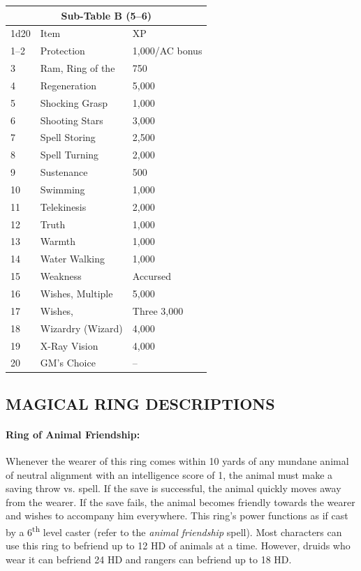 \begin{multicols}{2}
\begin{minipage}{\columnwidth}
\end{minipage}

\noindent
\begin{tabular}{|p{}|p{}|p{}|}
\multicolumn{3}{c}{Sub-Table B (5--6)} \\
\hline
1d20	& Item	& XP \\
\hline\hline
\rowcolor[gray]{.9}1--2	& Protection	& 1,000/AC bonus \\
3	& Ram, Ring of the	& 750 \\
\rowcolor[gray]{.9}4	& Regeneration	& 5,000 \\
5	& Shocking Grasp	& 1,000 \\
\rowcolor[gray]{.9}6	& Shooting Stars	& 3,000 \\
7	& Spell Storing	& 2,500 \\
\rowcolor[gray]{.9}8	& Spell Turning	& 2,000 \\
9	& Sustenance	& 500 \\
\rowcolor[gray]{.9}10	& Swimming	& 1,000 \\
11	& Telekinesis	& 2,000 \\
\rowcolor[gray]{.9}12	& Truth	& 1,000 \\
13	& Warmth	& 1,000 \\
\rowcolor[gray]{.9}14	& Water Walking	& 1,000 \\
15	& Weakness	& Accursed \\
\rowcolor[gray]{.9}16	& Wishes, Multiple	& 5,000 \\
17	& Wishes, & Three	3,000 \\
\rowcolor[gray]{.9}18	& Wizardry (Wizard)	& 4,000 \\
19	& X-Ray Vision	& 4,000 \\
\rowcolor[gray]{.9}20	& GM's Choice	& -- \\
\hline
\end{tabular}

\subsection{MAGICAL RING DESCRIPTIONS}

\paragraph{Ring of Animal Friendship:} Whenever the wearer of this ring comes within 10 yards of any mundane animal of neutral alignment with an intelligence score of 1, the animal must make a saving throw vs. spell.  If the save is successful, the animal quickly moves away from the wearer.  If the save fails, the animal becomes friendly towards the wearer and wishes to accompany him everywhere.  This ring's power functions as if cast by a 6\textsuperscript{th} level caster (refer to the \textit{animal friendship} spell).  Most characters can use this ring to befriend up to 12 HD of animals at a time.  However, druids who wear it can befriend 24 HD and rangers can befriend up to 18 HD.


\end{multicols}
